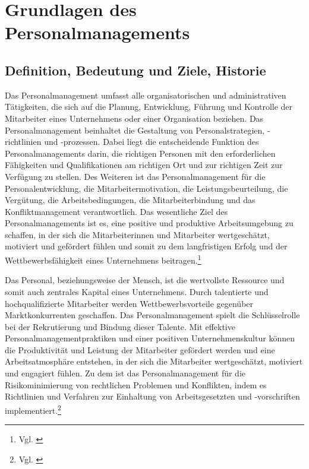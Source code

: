 

\section{Grundlagen des Personalmanagements} 
\label{sec:grundlagenpersonalmanagement}

\subsection{Definition, Bedeutung und Ziele, Historie}
\label{sec:gl_definition}
Das Personalmanagement umfasst alle organisatorischen und administrativen Tätigkeiten, die sich auf die Planung, Entwicklung, Führung und Kontrolle der Mitarbeiter eines Unternehmens oder einer Organisation beziehen. Das Personalmanagement beinhaltet die Gestaltung von Personalstrategien, -richtlinien und -prozessen. Dabei liegt die entscheidende Funktion des Personalmanagements darin, die richtigen Personen mit den erforderlichen Fähigkeiten und Qualifikationen am richtigen Ort und zur richtigen Zeit zur Verfügung zu stellen. Des Weiteren ist das Personalmanagement für die Personalentwicklung, die Mitarbeitermotivation, die Leistungsbeurteilung, die Vergütung, die Arbeitsbedingungen, die Mitarbeiterbindung und das Konfliktmanagement verantwortlich. Das wesentliche Ziel des Personalmanagements ist es, eine positive und produktive Arbeitsumgebung zu schaffen, in der sich die Mitarbeiterinnen und Mitarbeiter wertgeschätzt, motiviert und gefördert fühlen und somit zu dem langfristigen Erfolg und der Wettbewerbsfähigkeit eines Unternehmens beitragen.\footnote{Vgl. \cite{personio:PersoManagement}}

Das Personal, beziehungsweise der Mensch, ist die wertvollste Ressource und somit auch zentrales Kapital eines Unternehmens. Durch talentierte und hochqualifizierte Mitarbeiter werden Wettbewerbsvorteile gegenüber Marktkonkurrenten geschaffen. Das Personalmanagement spielt die Schlüsselrolle bei der Rekrutierung und Bindung dieser Talente. Mit effektive Personalmanagementpraktiken und einer positiven Unternehmenskultur können die Produktivität und Leistung der Mitarbeiter gefördert werden und eine Arbeitsatmosphäre entstehen, in der sich die Mitarbeiter wertgeschätzt, motiviert und engagiert fühlen. Zu dem ist das Personalmanagement für die Risikominimierung von rechtlichen Problemen und Konflikten, indem es Richtlinien und Verfahren zur Einhaltung von Arbeitsgesetzten und -vorschriften implementiert.\footnote{Vgl. \cite{lernort-mint:PMBedeutungZiele}}

